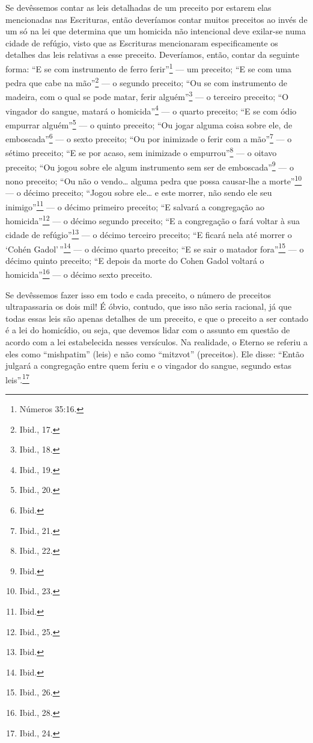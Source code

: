 Se devêssemos contar as leis detalhadas de um preceito por estarem elas
mencionadas nas Escrituras, então deveríamos contar muitos preceitos ao
invés de um só na lei que determina que um homicida não intencional deve
exilar-se numa cidade de refúgio, visto que as Escrituras mencionaram
especificamente os detalhes das leis relativas a esse preceito.
Deveríamos, então, contar da seguinte forma: ``E se com instrumento de
ferro ferir''\footnote{Números 35:16.} --- um preceito; ``E se com uma pedra que
cabe na mão''\footnote{Ibid., 17.} --- o segundo preceito; ``Ou se com
instrumento de madeira, com o qual se pode matar, ferir alguém''\footnote{Ibid.,
18.} --- o terceiro preceito; ``O vingador do sangue, matará o homicida''\footnote{Ibid., 19.} --- o quarto preceito; ``E se com ódio empurrar alguém''\footnote{Ibid., 20.} --- o quinto preceito; ``Ou jogar alguma coisa sobre ele, de
emboscada''\footnote{Ibid.} --- o sexto preceito; ``Ou por inimizade o ferir
com a mão''\footnote{Ibid., 21.} --- o sétimo preceito; ``E se por acaso, sem inimizade o empurrou''\footnote{Ibid., 22.} --- o oitavo preceito; ``Ou jogou sobre ele algum instrumento sem ser  de emboscada''\footnote{Ibid.} --- o nono preceito; ``Ou não o vendo\ldots{} alguma
  pedra que possa causar-lhe a morte''\footnote{Ibid., 23.} --- o décimo
  preceito; ``Jogou sobre ele\ldots{} e este morrer, não sendo ele seu
  inimigo''\footnote{Ibid.} --- o décimo primeiro preceito; ``E salvará a
  congregação ao homicida''\footnote{Ibid., 25.} --- o décimo segundo preceito;
  ``E a congregação o fará voltar à sua cidade de refúgio''\footnote{Ibid.} ---
  o décimo terceiro preceito; ``E ficará nela até morrer o `Cohén
  Gadol'\,''\footnote{Ibid.} --- o décimo quarto preceito; ``E se sair o matador fora''\footnote{Ibid., 26.} --- o décimo quinto preceito; ``E depois da morte do Cohen Gadol voltará o homicida''\footnote{Ibid., 28.} --- o décimo sexto preceito.

Se devêssemos fazer isso em todo e cada preceito, o número de preceitos
ultrapassaria os dois mil! É óbvio, contudo, que isso não seria
racional, já que todas essas leis são apenas detalhes de um preceito, e
que o preceito a ser contado é a lei do homicídio, ou seja, que devemos
lidar com o assunto em questão de acordo com a lei estabelecida nesses
versículos. Na realidade, o Eterno se referiu a eles como ``mishpatim''
(leis) e não como ``mitzvot'' (preceitos). Ele disse: ``Então julgará a
congregação entre quem feriu e o vingador do sangue, segundo estas
leis''.\footnote{Ibid., 24.}

